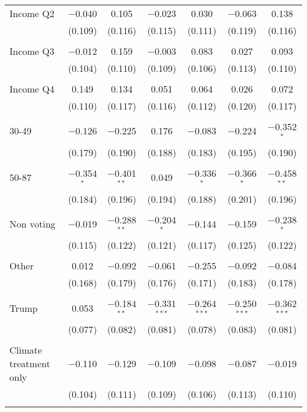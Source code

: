 \begin{tabular}{@{\extracolsep{5pt}}lcccccc}
 Income Q2 & $-$0.040 & 0.105 & $-$0.023 & 0.030 & $-$0.063 & 0.138 \\ 
  & (0.109) & (0.116) & (0.115) & (0.111) & (0.119) & (0.116) \\ 
  & & & & & & \\ 
 Income Q3 & $-$0.012 & 0.159 & $-$0.003 & 0.083 & 0.027 & 0.093 \\ 
  & (0.104) & (0.110) & (0.109) & (0.106) & (0.113) & (0.110) \\ 
  & & & & & & \\ 
 Income Q4 & 0.149 & 0.134 & 0.051 & 0.064 & 0.026 & 0.072 \\ 
  & (0.110) & (0.117) & (0.116) & (0.112) & (0.120) & (0.117) \\ 
  & & & & & & \\ 
 30-49 & $-$0.126 & $-$0.225 & 0.176 & $-$0.083 & $-$0.224 & $-$0.352$^{*}$ \\ 
  & (0.179) & (0.190) & (0.188) & (0.183) & (0.195) & (0.190) \\ 
  & & & & & & \\ 
 50-87 & $-$0.354$^{*}$ & $-$0.401$^{**}$ & 0.049 & $-$0.336$^{*}$ & $-$0.366$^{*}$ & $-$0.458$^{**}$ \\ 
  & (0.184) & (0.196) & (0.194) & (0.188) & (0.201) & (0.196) \\ 
  & & & & & & \\ 
 Non voting & $-$0.019 & $-$0.288$^{**}$ & $-$0.204$^{*}$ & $-$0.144 & $-$0.159 & $-$0.238$^{*}$ \\ 
  & (0.115) & (0.122) & (0.121) & (0.117) & (0.125) & (0.122) \\ 
  & & & & & & \\ 
 Other & 0.012 & $-$0.092 & $-$0.061 & $-$0.255 & $-$0.092 & $-$0.084 \\ 
  & (0.168) & (0.179) & (0.176) & (0.171) & (0.183) & (0.178) \\ 
  & & & & & & \\ 
 Trump & 0.053 & $-$0.184$^{**}$ & $-$0.331$^{***}$ & $-$0.264$^{***}$ & $-$0.250$^{***}$ & $-$0.362$^{***}$ \\ 
  & (0.077) & (0.082) & (0.081) & (0.078) & (0.083) & (0.081) \\ 
  & & & & & & \\ 
 Climate treatment only & $-$0.110 & $-$0.129 & $-$0.109 & $-$0.098 & $-$0.087 & $-$0.019 \\ 
  & (0.104) & (0.111) & (0.109) & (0.106) & (0.113) & (0.110) \\ 
  & & & & & & \\ 

\end{tabular}
